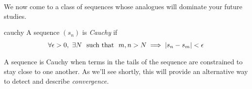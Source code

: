 
We now come to a class of sequences whose analogues will dominate your future studies.

\begin{defn}{}{cauchy}
	A sequence $(s_n)$ is \emph{Cauchy\footnotemark} if
	\[
		\forall\epsilon>0,\ \exists N\ \text{ such that }\  m,n>N\implies\left| s_n-s_m\right|<\epsilon
	\]
\end{defn}


A sequence is Cauchy when terms in the tails of the sequence are constrained to stay close to one another. As we'll see shortly, this will provide an alternative way to detect and describe \emph{convergence.}


